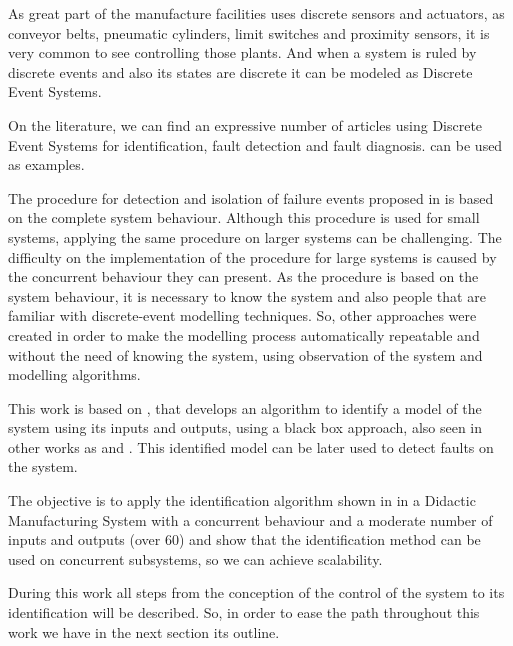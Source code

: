
As great part of the manufacture facilities uses discrete sensors and actuators,
as conveyor belts, pneumatic cylinders, limit switches and proximity sensors, it
is very common to see \PLCs{} controlling those plants. And when a system is ruled
by discrete events and also its states are discrete it can be modeled as
Discrete Event Systems.

On the literature, we can find an expressive number of articles using Discrete
Event Systems for identification, fault detection and fault diagnosis.
\cite{veras2018distributed,cabral2017synchronous,kumar2014comments,klein2005fault,CARVALHO2017315,VIANA2019354,sampath1995}
can be used as examples.

The procedure for detection and isolation of failure events proposed in
\cite{sampath1995} is based on the complete system behaviour. Although this
procedure is used for small systems, applying
the same procedure on larger systems can be challenging. The difficulty on the
implementation of the procedure for large systems is caused by the concurrent
behaviour they can present. As the procedure is based on the system behaviour,
it is necessary to know the system and also people that are familiar with
discrete-event modelling techniques. So, other approaches were created in order
to make the modelling process automatically repeatable and without the need of
knowing the system, using observation of the system and modelling algorithms. 


This work is based on \cite{moreira2018enhanced}, that
develops an algorithm to identify a model of the system using its inputs
and outputs, using a black box approach, also seen in other works as
\cite{klein2005fault} and \cite{roth2009fdi}. This identified model can be later
used to detect faults on the system.

The objective is to apply the identification algorithm shown in
\cite{moreira2018enhanced} in a Didactic Manufacturing System with a
concurrent behaviour and a moderate number of inputs and outputs (over 60) and
show that the identification method can be used on concurrent subsystems, so we can
achieve scalability.


During this work all steps from the conception of the control of the system to
its identification will be described. So, in order to ease the path throughout
this work we have in the next section its outline.

